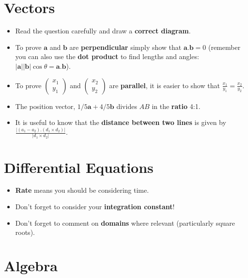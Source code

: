\documentclass[9pt]{extarticle}
\begin{document}
	\section{Vectors}
	
	\begin{itemize}
		\item Read the question carefully and draw a \textbf{correct diagram}.
		\item To prove $\mathbf{a}$ and $\mathbf{b}$ are \textbf{perpendicular} simply show that $\mathbf{a}.\mathbf{b}=0$ (remember you can also use the \textbf{dot product} to find lengths and angles: $|\mathbf{a}||\mathbf{b}|\cos\theta = \mathbf{a}.\mathbf{b}$).
		\item To prove $\begin{pmatrix}x_1\\y_1\end{pmatrix}$ and $\begin{pmatrix}x_2\\y_2\end{pmatrix}$ are \textbf{parallel}, it is easier to show that $\frac{x_1}{y_1}=\frac{x_2}{y_2}$.
		\item The position vector, $1/5 \mathbf{a} + 4/5 \mathbf{b}$ divides $AB$ in the \textbf{ratio} 4:1.
		\item It is useful to know that the \textbf{distance between two lines} is given by $\frac{|(a_1-a_2).(d_1 \times d_2)|}{|d_1 \times d_2|}$.
	\end{itemize}
	
	\section{Differential Equations}
	
	\begin{itemize}
		\item \textbf{Rate} means you should be considering time.
		\item Don't forget to consider your \textbf{integration constant}!
		\item Don't forget to comment on \textbf{domains} where relevant (particularly square roots).
	\end{itemize}
	
	\section{Algebra}
	
\end{document}
